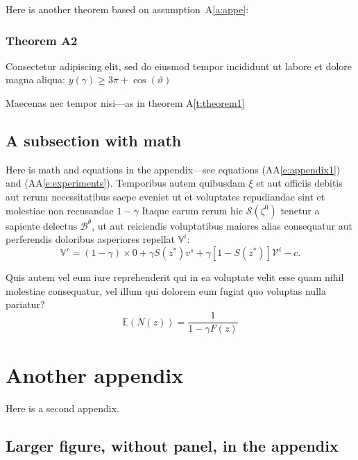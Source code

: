 \documentclass{article}
\begin{document}
 \wcTpLoremIpsum*[type=sentence,words-per-sentence=25,seed=166]{}  Here is another theorem based on assumption~A\ref{a:appe}:
\subsubsection*{Theorem A2}

Consectetur adipiscing elit, sed do eiusmod tempor incididunt ut labore et dolore magna aliqua: $y(\gamma) \geq 3\pi + \cos(\vartheta)$
\setcounter{paperref}{1}\label{t:theorem1}

 \wcTpLoremIpsum*[type=sentence,words-per-sentence=57,seed=167]{}  Maecenas nec tempor nisi---as in theorem A\ref{t:theorem1}

\subsection{A subsection with math}

Here is math and equations in the appendix---see equations (AA\ref{e:appendix1}) and (AA\ref{e:experiments}). Temporibus autem quibusdam $\xi$ et aut officiis debitis aut rerum necessitatibus saepe eveniet ut et voluptates repudiandae sint et molestiae non recusandae $1-\gamma$ Itaque earum rerum hic $\mathcal{S}(\zeta^0)$ tenetur a sapiente delectus $\mathcal{B}^\theta$, ut aut reiciendis voluptatibus maiores alias consequatur aut perferendis doloribus asperiores repellat $\mathbb{V}^i$:
\setcounter{paperref}{1}\label{e:appendix1}\[

\mathbb{V}^r = (1-\gamma) \times 0 +\gamma S(z^*) v^s+\gamma [1-S(z^*)] \mathcal{V}^i-c.
\tag{A2}
\]

 \wcTpLoremIpsum*[type=sentence,words-per-sentence=19,seed=168]{}  Quis autem vel eum iure reprehenderit qui in ea voluptate velit esse quam nihil molestiae consequatur, vel illum qui dolorem eum fugiat quo voluptas nulla pariatur? 
\setcounter{paperref}{2}\label{e:experiments}\[

\mathbb{E}(N(z)) = \frac{1}{1-\gamma F(z)}
\tag{A3}
\]

\section{Another appendix}\label{a:appendix2}

Here is a second appendix. \wcTpLoremIpsum*[type=sentence,words-per-sentence=17,seed=169]{} 

\subsection{Larger figure, without panel, in the appendix} 
\end{document}
